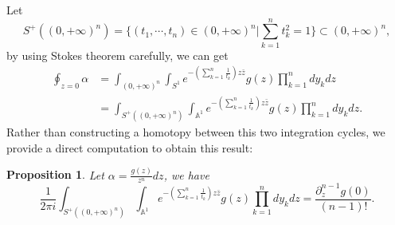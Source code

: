 \documentclass[11pt]{amsart}
\newtheorem{prop}[thm]{Proposition}
\theoremstyle{definition}
\theoremstyle{remark}
\numberwithin{equation}{section}
\begin{document}
Let
$$S^{+}((0,+\infty)^n)=\{(t_{1},\cdots,t_{n})\in(0,+\infty)^{n}|\sum_{k=1}^{n}t_{k}^{2}=1\} \subset (0,+\infty)^{n},
$$
by using Stokes theorem carefully, we can get
\begin{align*}
\oint_{z=0}\alpha
&=\int_{(0,+\infty)^{n}}\int_{S^{1}}e^{-\left(\sum_{k=1}^{n}\frac{1}{t_{k}}\right)z\bar{z}}g(z)\prod_{k=1}^{n}dy_{k}dz\\
&=\int_{S^{+}((0,+\infty)^n)}\int_{\mathbb{A}^{1}}e^{-\left(\sum_{k=1}^{n}\frac{1}{t_{k}}\right)z\bar{z}}g(z)\prod_{k=1}^{n}dy_{k}dz.
\end{align*}
Rather than constructing a homotopy between this two integration cycles, we provide a direct computation to obtain this result:
\begin{prop}
    Let $\alpha=\frac{g(z)}{z^{n}}dz$, we have
    $$
    \frac{1}{2\pi i}\int_{S^{+}((0,+\infty)^n)}\int_{\mathbb{A}^{1}}e^{-\left(\sum_{k=1}^{n}\frac{1}{t_{k}}\right)z\bar{z}}g(z)\prod_{k=1}^{n}dy_{k}dz=\frac{\partial_{z}^{n-1}g(0)}{(n-1)!}.
    $$
\end{prop}
\end{document}
